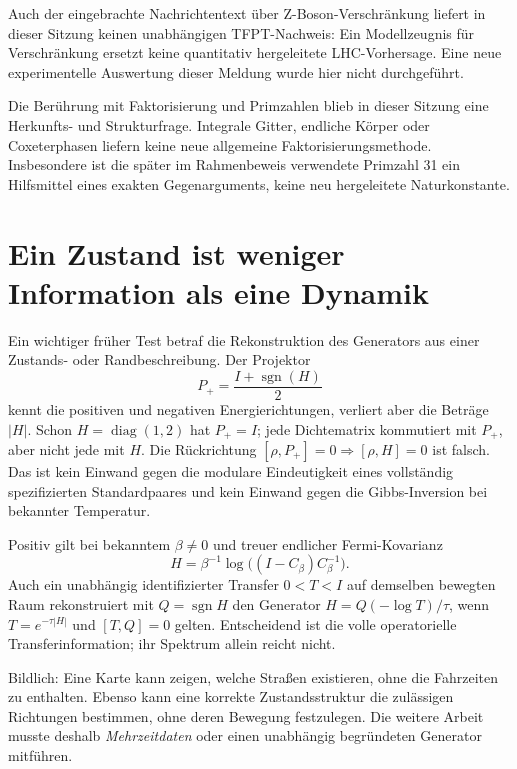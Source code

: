 Auch der eingebrachte Nachrichtentext über Z-Boson-Verschränkung liefert in dieser Sitzung keinen unabhängigen TFPT-Nachweis: Ein Modellzeugnis für Verschränkung ersetzt keine quantitativ hergeleitete LHC-Vorhersage. Eine neue experimentelle Auswertung dieser Meldung wurde hier nicht durchgeführt.

Die Berührung mit Faktorisierung und Primzahlen blieb in dieser Sitzung eine Herkunfts- und Strukturfrage. Integrale Gitter, endliche Körper oder Coxeterphasen liefern keine neue allgemeine Faktorisierungsmethode. Insbesondere ist die später im Rahmenbeweis verwendete Primzahl 31 ein Hilfsmittel eines exakten Gegenarguments, keine neu hergeleitete Naturkonstante.

\section{Ein Zustand ist weniger Information als eine Dynamik}
Ein wichtiger früher Test betraf die Rekonstruktion des Generators aus einer Zustands- oder Randbeschreibung. Der Projektor
\[
 P_+=\frac{I+\operatorname{sgn}(H)}2
\]
kennt die positiven und negativen Energierichtungen, verliert aber die Beträge $|H|$. Schon $H=\operatorname{diag}(1,2)$ hat $P_+=I$; jede Dichtematrix kommutiert mit $P_+$, aber nicht jede mit $H$. Die Rückrichtung $[\rho,P_+]=0\Rightarrow[\rho,H]=0$ ist falsch. Das ist kein Einwand gegen die modulare Eindeutigkeit eines vollständig spezifizierten Standardpaares und kein Einwand gegen die Gibbs-Inversion bei bekannter Temperatur. 

Positiv gilt bei bekanntem $\beta\ne0$ und treuer endlicher Fermi-Kovarianz
\[
 H=\beta^{-1}\log\bigl((I-C_\beta)C_\beta^{-1}\bigr).
\]
Auch ein unabhängig identifizierter Transfer $0<T<I$ auf demselben bewegten Raum rekonstruiert mit $Q=\operatorname{sgn}H$ den Generator $H=Q(-\log T)/\tau$, wenn $T=e^{-\tau|H|}$ und $[T,Q]=0$ gelten. Entscheidend ist die volle operatorielle Transferinformation; ihr Spektrum allein reicht nicht. 

Bildlich: Eine Karte kann zeigen, welche Straßen existieren, ohne die Fahrzeiten zu enthalten. Ebenso kann eine korrekte Zustandsstruktur die zulässigen Richtungen bestimmen, ohne deren Bewegung festzulegen. Die weitere Arbeit musste deshalb \emph{Mehrzeitdaten} oder einen unabhängig begründeten Generator mitführen.

